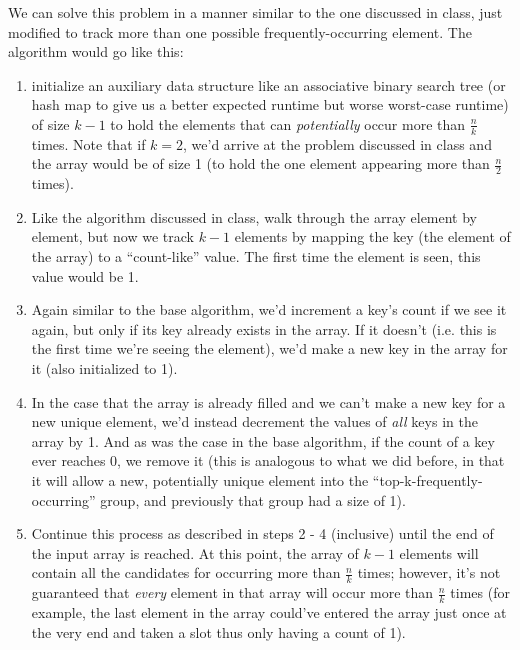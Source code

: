 \documentclass[12pt]{article}
\begin{document}
\begin{enumerate}
    We can solve this problem in a manner similar to the one discussed in class, just modified to 
    track more than one possible frequently-occurring element. The algorithm would go like this:

    \begin{enumerate}
        \item initialize an auxiliary data structure like an associative binary search tree (or hash map to give us 
        a better expected runtime but worse worst-case runtime) of size $k - 1$ to hold the elements that can 
        \textit{potentially} occur more than $\frac{n}{k}$ times. Note that if $k = 2$, we'd 
        arrive at the problem discussed in class and the array would be of size 1 (to hold the 
        one element appearing more than $\frac{n}{2}$ times).
        
        \item Like the algorithm discussed in class, walk through the array element by element, 
        but now we track $k - 1$ elements by mapping the key (the element of the array) to a ``count-like'' value. 
        The first time the element is seen, this value would be 1.
        
        \item Again similar to the base algorithm, we'd increment a key's count if we see it again, but 
        only if its key already exists in the array. If it doesn't (i.e. this is the first time we're 
        seeing the element), we'd make a new key in the array for it (also initialized to 1).
        
        \item In the case that the array is already filled and we can't make a new key for a new unique 
        element, we'd instead decrement the values of \textit{all} keys in the array by 1. And 
        as was the case in the base algorithm, if the count of a key ever reaches 0, we remove it (this is 
        analogous to what we did before, in that it will allow a new, potentially unique element into the 
        ``top-k-frequently-occurring'' group, and previously that group had a size of 1).

        \item Continue this process as described in steps 2 - 4 (inclusive) until the end of the 
        input array is reached. At this point, the array of $k - 1$ elements will contain all 
        the candidates for occurring more than $\frac{n}{k}$ times; however, it's not guaranteed 
        that \textit{every} element in that array will occur more than $\frac{n}{k}$ times (for example, 
        the last element in the array could've entered the array just once at the very end and 
        taken a slot thus only having a count of 1).


\end{enumerate}
\end{enumerate}
\end{document}
